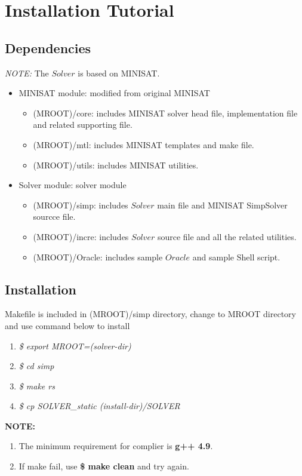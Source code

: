 \documentclass[proposal]{umassthesis}  %
\begin{document}
\section{Installation Tutorial}
	\subsection{Dependencies}
	\emph{NOTE:} The $Solver$ is based on MINISAT.
	\begin{itemize}
			\item MINISAT module: modified from original MINISAT
				\begin{itemize}
					\item (MROOT)/core: includes MINISAT solver head file, implementation file and related supporting file.
					\item (MROOT)/mtl: includes MINISAT templates and make file.
					\item (MROOT)/utils: includes MINISAT utilities.
				\end{itemize}
			\item Solver module: solver module
				\begin{itemize}
					\item (MROOT)/simp: includes $Solver$ main file and MINISAT SimpSolver sourcce file.
					\item (MROOT)/incre: includes $Solver$ source file and all the related utilities.
					\item (MROOT)/Oracle: includes sample $Oracle$ and sample Shell script.
				\end{itemize}
	\end{itemize}



	\subsection{Installation}
		Makefile is included in (MROOT)/simp directory, change to MROOT directory and use command below to install
		\begin{enumerate}
			\item \emph{\$ export MROOT=(solver-dir)}	
			\item \emph{\$ cd simp}
			\item \emph{\$ make rs}
			\item \emph{\$ cp SOLVER\_static (install-dir)/SOLVER}
		\end{enumerate}
		\textbf{NOTE:} 
		\begin{enumerate}
			\item The minimum requirement for complier is \textbf{g++ 4.9}.
			\item If make fail, use \textbf{\$ make clean} and try again.
		\end{enumerate}
\end{document}
